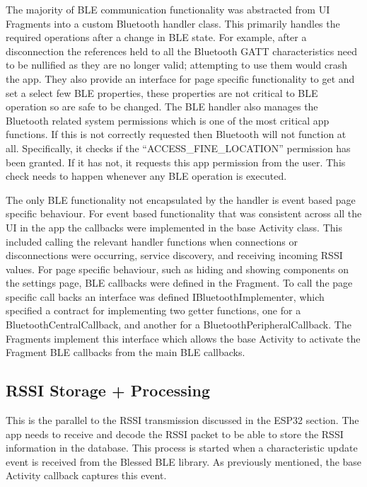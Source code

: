 \documentclass{l4proj}
\begin{document}
The majority of BLE communication functionality was abstracted from UI Fragments into a custom Bluetooth handler class. This primarily handles the required operations after a change in BLE state. For example, after a disconnection the references held to all the Bluetooth GATT characteristics need to be nullified as they are no longer valid; attempting to use them would crash the app. They also provide an interface for page specific functionality to get and set a select few BLE properties, these properties are not critical to BLE operation so are safe to be changed. The BLE handler also manages the Bluetooth related system permissions which is one of the most critical app functions. If this is not correctly requested then Bluetooth will not function at all. Specifically, it checks if the “ACCESS\_FINE\_LOCATION” permission has been granted. If it has not, it requests this app permission from the user. This check needs to happen whenever any BLE operation is executed.

The only BLE functionality not encapsulated by the handler is event based page specific behaviour. For event based functionality that was consistent across all the UI in the app the callbacks were implemented in the base Activity class. This included calling the relevant handler functions when connections or disconnections were occurring, service discovery, and receiving incoming RSSI values. For page specific behaviour, such as hiding and showing components on the settings page, BLE callbacks were defined in the Fragment. To call the page specific call backs an interface was defined IBluetoothImplementer, which specified a contract for implementing two getter functions, one for a BluetoothCentralCallback, and another for a BluetoothPeripheralCallback. The Fragments implement this interface which allows the base Activity to activate the Fragment BLE callbacks from the main BLE callbacks.

\subsection{RSSI Storage + Processing}

This is the parallel to the RSSI transmission discussed in the ESP32 section. The app needs to receive and decode the RSSI packet to be able to store the RSSI information in the database. This process is started when a characteristic update event is received from the Blessed BLE library. As previously mentioned, the base Activity callback captures this event.
\end{document}
